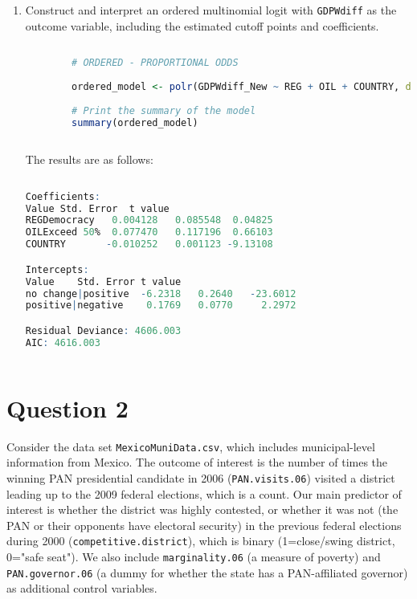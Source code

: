 \documentclass[12pt,letterpaper]{article}
\begin{document}
\begin{enumerate}
\begin{lstlisting}[language=R]
		\end{lstlisting}
		
	
	\item Construct and interpret an ordered multinomial logit with \texttt{GDPWdiff} as the outcome variable, including the estimated cutoff points and coefficients.
	
	\begin{lstlisting}[language=R]
		
		# ORDERED - PROPORTIONAL ODDS
		
		ordered_model <- polr(GDPWdiff_New ~ REG + OIL + COUNTRY, data = gdp_data, Hess=TRUE)
		
		# Print the summary of the model
		summary(ordered_model)
				
	\end{lstlisting}
	
	The results are as follows:
	
		\begin{lstlisting}[language=R]
		
Coefficients:
Value Std. Error  t value
REGDemocracy   0.004128   0.085548  0.04825
OILExceed 50%  0.077470   0.117196  0.66103
COUNTRY       -0.010252   0.001123 -9.13108

Intercepts:
Value    Std. Error t value 
no change|positive  -6.2318   0.2640   -23.6012
positive|negative    0.1769   0.0770     2.2972

Residual Deviance: 4606.003 
AIC: 4616.003 
		
	\end{lstlisting}
	

\end{enumerate}

\section*{Question 2} 
\vspace{.25cm}

\noindent Consider the data set \texttt{MexicoMuniData.csv}, which includes municipal-level information from Mexico. The outcome of interest is the number of times the winning PAN presidential candidate in 2006 (\texttt{PAN.visits.06}) visited a district leading up to the 2009 federal elections, which is a count. Our main predictor of interest is whether the district was highly contested, or whether it was not (the PAN or their opponents have electoral security) in the previous federal elections during 2000 (\texttt{competitive.district}), which is binary (1=close/swing district, 0="safe seat"). We also include \texttt{marginality.06} (a measure of poverty) and \texttt{PAN.governor.06} (a dummy for whether the state has a PAN-affiliated governor) as additional control variables. 
\end{document}
